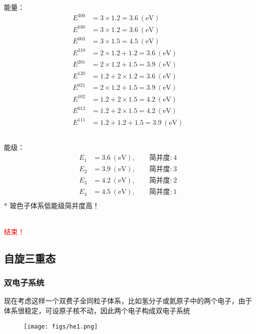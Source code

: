\begin{frame}[label=current]
  \frametitle{}
能量：
\[\begin{aligned}
  E^{300} &=  3\times 1.2 = 3.6  ~ (\text{eV}) \\
  E^{030} &=  3\times 1.2 = 3.6  ~ (\text{eV}) \\
  E^{003} &=  3\times 1.5 = 4.5  ~ (\text{eV})  \\
  E^{210} &=  2\times 1.2 +1.2 = 3.6  ~ (\text{eV})  \\
  E^{201} &=  2\times 1.2 +1.5 = 3.9  ~ (\text{eV})  \\
  E^{120} &=  1.2+ 2\times 1.2 = 3.6  ~ (\text{eV})  \\
  E^{021} &=  2\times 1.2 + 1.5= 3.9  ~ (\text{eV})  \\
  E^{102} &=  1.2+2\times 1.5= 4.2  ~ (\text{eV})  \\
  E^{012} &=  1.2+2\times 1.5= 4.2  ~ (\text{eV})  \\
  E^{111} &=  1.2+1.2+1.5= 3.9  ~ (\text{eV})  \\
\end{aligned} \]
\end{frame} 

\begin{frame}[label=current]
  \frametitle{}
  能级：
  $$ \begin{aligned} E_1&= 3.6~ (\text{eV}), \qquad \text{简并度:} ~4  \\ 
    E_2&= 3.9~ (\text{eV}), \qquad \text{简并度:} ~3  \\
    E_3&= 4.2~ (\text{eV}), \qquad \text{简并度:} ~2  \\
    E_4&= 4.5~ (\text{eV}), \qquad \text{简并度:} ~1  \\
  \end{aligned} $$
* 玻色子体系低能级简并度高！

  ~~\\ 
  \textcolor{red}{结束！}
\end{frame} 

\subsection{自旋三重态}

\begin{frame}[label=current]
  \frametitle{双电子系统}
现在考虑这样一个双费子全同粒子体系，比如氢分子或氦原子中的两个电子，由于体系很稳定，可设原子核不动，因此两个电子构成双电子系统
\begin{figure}[htbp]
  \centering
  \texttt{[image: figs/he1.png]}
\end{figure}
\end{frame} 

